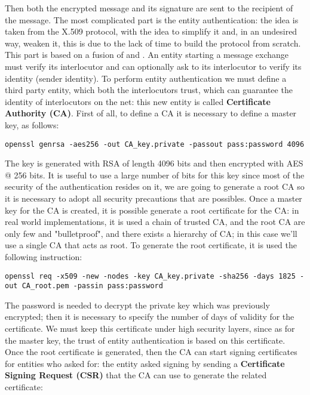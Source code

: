 \documentclass{article}
\begin{document}
Then both the encrypted message and its signature are sent to the recipient of the message. \newline
The most complicated part is the entity authentication: the idea is taken from the X.509 protocol, with the idea to simplify it and, in an undesired way, weaken it, this is due to the lack of time to build the protocol from scratch. This part is based on a fusion of \cite{certificates1} and \cite{certificates2}. An entity starting a message exchange must verify its interlocutor and can optionally ask to its interlocutor to verify its identity (sender identity). To perform entity authentication we must define a third party entity, which both the interlocutors trust, which can guarantee the identity of interlocutors on the net: this new entity is called \textbf{Certificate Authority (CA)}. First of all, to define a CA it is necessary to define a master key, as follows: 

\begin{lstlisting}[breaklines]
openssl genrsa -aes256 -out CA_key.private -passout pass:password 4096
\end{lstlisting}

The key is generated with RSA of length 4096 bits and then encrypted with AES @ 256 bits. It is useful to use a large number of bits for this key since most of the security of the authentication resides on it, we are going to generate a root CA so it is necessary to adopt all security precautions that are possibles. Once a master key for the CA is created, it is possible generate a root certificate for the CA: in real world implementations, it is used a chain of trusted CA, and the root CA are only few and "bulletproof", and there exists a hierarchy of CA; in this case we'll use a single CA that acts as root. To generate the root certificate, it is used the following instruction:  

\begin{lstlisting}[breaklines]
openssl req -x509 -new -nodes -key CA_key.private -sha256 -days 1825 -out CA_root.pem -passin pass:password
\end{lstlisting}

The password is needed to decrypt the private key which was previously encrypted; then it is necessary to specify the number of days of validity for the certificate. We must keep this certificate under high security layers, since as for the master key, the trust of entity authentication is based on this certificate. Once the root certificate is generated, then the CA can start signing certificates for entities who asked for: the entity asked signing by sending a \textbf{Certificate Signing Request (CSR)} that the CA can use to generate the related certificate:
\end{document}
